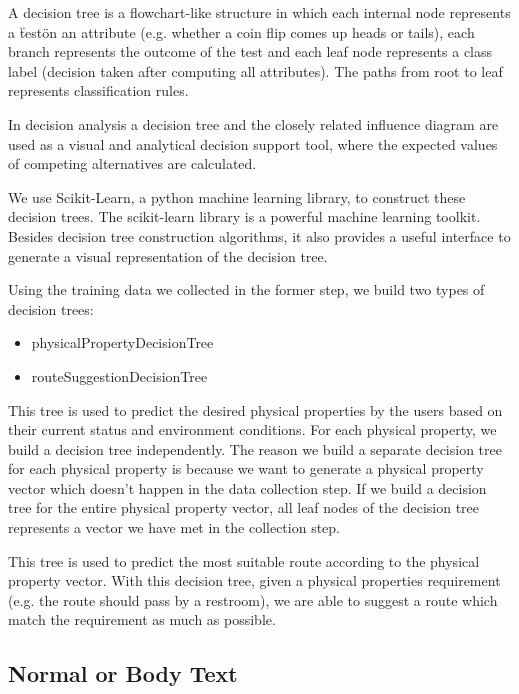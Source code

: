 \documentclass{sigchi}
\begin{document}
A decision tree is a flowchart-like structure in which each internal node represents a \"test\" on an attribute (e.g. whether a coin flip comes up heads or tails), each branch represents the outcome of the test and each leaf node represents a class label (decision taken after computing all attributes). The paths from root to leaf represents classification rules.


In decision analysis a decision tree and the closely related influence diagram are used as a visual and analytical decision support tool, where the expected values of competing alternatives are calculated.


We use Scikit-Learn, a python machine learning library, to construct these decision trees. The scikit-learn library is a powerful machine learning toolkit. Besides decision tree construction algorithms, it also provides a useful interface to generate a visual representation of the decision tree.


Using the training data we collected in the former step, we build two types of decision trees:
\begin{itemize}
\item physicalPropertyDecisionTree
\item routeSuggestionDecisionTree
\end{itemize}

This tree  is used to predict the desired physical properties by the users based on their current status and environment conditions. For each physical property, we build a decision tree independently. The reason we build a separate decision tree for each physical property is because we want to generate a physical property vector which doesn’t happen in the data collection step. If we build a decision tree for the entire physical property vector, all leaf nodes of the decision tree represents a vector we have met in the collection step.

This tree is used to predict the most suitable route according to the physical property vector. With this decision tree, given a physical properties requirement (e.g. the route should pass by a restroom), we are able to suggest a route which match the requirement as much as possible.

\subsection{Normal or Body Text}
\end{document}
